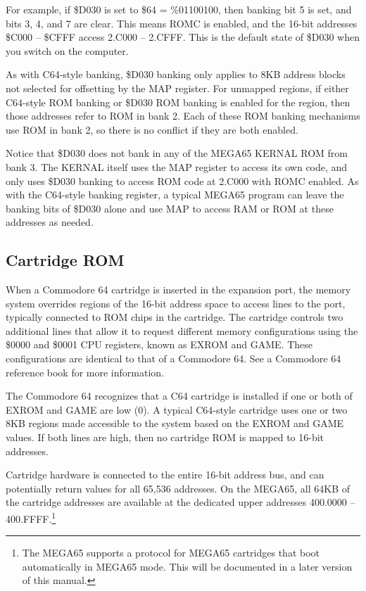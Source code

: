 For example, if \$D030 is set to \$64 = \%01100100, then banking bit 5 is set, and bits 3, 4, and 7 are clear. This means ROMC is enabled, and the 16-bit addresses \$C000 -- \$CFFF access 2.C000 -- 2.CFFF. This is the default state of \$D030 when you switch on the computer.

As with C64-style banking, \$D030 banking only applies to 8KB address blocks not selected for offsetting by the MAP register. For unmapped regions, if either C64-style ROM banking or \$D030 ROM banking is enabled for the region, then those addresses refer to ROM in bank 2. Each of these ROM banking mechanisms use ROM in bank 2, so there is no conflict if they are both enabled.

Notice that \$D030 does not bank in any of the MEGA65 KERNAL ROM from bank 3. The KERNAL itself uses the MAP register to access its own code, and only uses \$D030 banking to access ROM code at 2.C000 with ROMC enabled. As with the C64-style banking register, a typical MEGA65 program can leave the banking bits of \$D030 alone and use MAP to access RAM or ROM at these addresses as needed.

\subsection{Cartridge ROM}

When a Commodore 64 cartridge is inserted in the expansion port, the memory system overrides regions of the 16-bit address space to access lines to the port, typically connected to ROM chips in the cartridge. The cartridge controls two additional lines that allow it to request different memory configurations using the \$0000 and \$0001 CPU registers, known as EXROM and GAME. These configurations are identical to that of a Commodore 64. See a Commodore 64 reference book for more information.

The Commodore 64 recognizes that a C64 cartridge is installed if one or both of EXROM and GAME are low (0). A typical C64-style cartridge uses one or two 8KB regions made accessible to the system based on the EXROM and GAME values. If both lines are high, then no cartridge ROM is mapped to 16-bit addresses.

Cartridge hardware is connected to the entire 16-bit address bus, and can potentially return values for all 65,536 addresses. On the MEGA65, all 64KB of the cartridge addresses are available at the dedicated upper addresses 400.0000 -- 400.FFFF.\footnote{The MEGA65 supports a protocol for MEGA65 cartridges that boot automatically in MEGA65 mode. This will be documented in a later version of this manual.}

